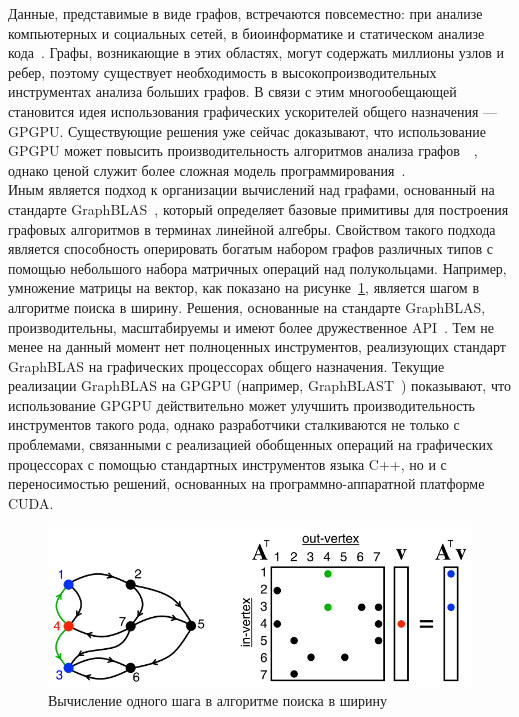 
Данные, представимые в виде графов, встречаются повсеместно: при анализе компьютерных и социальных сетей, в биоинформатике и статическом анализе кода~\cite{gb_math}. Графы, возникающие в этих областях, могут содержать миллионы узлов и ребер, поэтому существует необходимость в высокопроизводительных инструментах анализа больших графов. В связи с этим многообещающей становится идея использования графических ускорителей общего назначения --- GPGPU. Существующие решения уже сейчас доказывают, что использование GPGPU может повысить производительность алгоритмов анализа графов~\cite{cusha}~\cite{mGPU}, однако ценой служит более сложная модель программирования~\cite{blast}. \\ Иным является подход к организации вычислений над графами, основанный на стандарте GraphBLAS~\cite{gb_math}, который определяет базовые примитивы для построения графовых алгоритмов в терминах линейной алгебры. Свойством такого подхода является способность оперировать богатым набором графов различных типов с помощью небольшого набора матричных операций над полукольцами. Например, умножение матрицы на вектор, как показано на рисунке~\ref{fig:bfs_step}, является шагом в алгоритме поиска в ширину. Решения, основанные на стандарте GraphBLAS, производительны, масштабируемы и имеют более дружественное API~\cite{sevengr}. Тем не менее на данный момент нет полноценных инструментов, реализующих стандарт GraphBLAS на графических процессорах общего назначения. Текущие реализации GraphBLAS на GPGPU (например, GraphBLAST~\cite{blast}) показывают, что использование GPGPU действительно может улучшить производительность инструментов такого рода, однако разработчики сталкиваются не только с проблемами, связанными с реализацией обобщенных операций на графических процессорах с помощью стандартных инструментов языка C++, но и с переносимостью решений, основанных на программно-аппаратной платформе CUDA.

\begin{figure}[h!]
    \centering
    \includegraphics[width=0.6\linewidth]{pictures/MatrixBFS.png}
    \caption{Вычисление одного шага в алгоритме поиска в ширину\footnotemark}
    \label{fig:bfs_step}
\end{figure}

